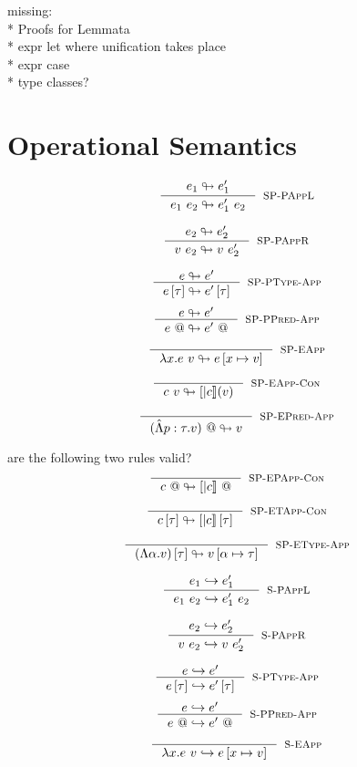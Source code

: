 \documentclass[10pt,a4paper]{article}
\newcommand\highlight[2]{{\setlength\fboxsep{1pt}\colorbox{#1}{#2}}}
\def\NV{\highlight{colorNV}}
\newcommand\rulename[1]{\textsc{#1}}
\newcommand\peval[2]{\ensuremath{#1 \looparrowright #2 }}
\newcommand\eval[2]{\ensuremath{#1 \hookrightarrow #2 }}
\begin{document}
\NV{missing:}\\
\NV{* Proofs for Lemmata}\\
\NV{* expr let where unification takes place}\\
\NV{* expr case}\\
\NV{* type classes?}\\


\section*{Operational Semantics}
\hfill\fbox{\peval{e}{e}}

$$
\inference{
	\peval{e_1}{e_1'}
}{
	\peval{\eapp{e_1}{e_2}}{\eapp{e_1'}{e_2}}
}[\rulename{SP-PAppL}]
$$

$$
\inference{
	\peval{e_2}{e_2'}
}{
	\peval{\eapp{v}{e_2}}{\eapp{v}{e_2'}}
}[\rulename{SP-PAppR}]
$$

$$
\inference{
	\peval{e}{e'}
}{
	\peval{\etapp{e}{\tau}}{\etapp{e'}{\tau}}
}[\rulename{SP-PType-App}]
$$
$$
\inference{
	\peval{e}{e'}
}{
	\peval{\epapp{e}}{\epapp{e'}}
}[\rulename{SP-PPred-App}]
$$

$$
\inference{
}{
	\peval{\eapp{\efun{x}{e}}{v}}{e\sub{x}{v}}
}[\rulename{SP-EApp}]
$$

$$
\inference{
}{
	\peval{\eapp{c}{v}}{[|c|](v)}
}[\rulename{SP-EApp-Con}]
$$

$$
\inference{
}{
	\peval{\epapp{(\epabs{p}{\tau}{v})}}{v}
}[\rulename{SP-EPred-App}]
$$

\NV{are the following two rules valid?}
$$
\inference{
}{
	\peval{\epapp{c}}{\epapp{[|c|]}}
}[\rulename{SP-EPApp-Con}]
$$

$$
\inference{
}{
	\peval{\etapp{c}{\tau}}{\etapp{[|c|]}{\tau}}
}[\rulename{SP-ETApp-Con}]
$$

$$
\inference{
}{
	\peval{\etapp{(\etabs{\alpha}{v})}{\tau}}{v\sub{\alpha}{\tau}}
}[\rulename{SP-EType-App}]
$$


\hfill\fbox{\eval{e}{e}}

$$
\inference{
	\eval{e_1}{e_1'}
}{
	\eval{\eapp{e_1}{e_2}}{\eapp{e_1'}{e_2}}
}[\rulename{S-PAppL}]
$$

$$
\inference{
	\eval{e_2}{e_2'}
}{
	\eval{\eapp{v}{e_2}}{\eapp{v}{e_2'}}
}[\rulename{S-PAppR}]
$$

$$
\inference{
	\eval{e}{e'}
}{
	\eval{\etapp{e}{\tau}}{\etapp{e'}{\tau}}
}[\rulename{S-PType-App}]
$$
$$
\inference{
	\eval{e}{e'}
}{
	\eval{\epapp{e}}{\epapp{e'}}
}[\rulename{S-PPred-App}]
$$

$$
\inference{
}{
	\eval{\eapp{\efun{x}{e}}{v}}{e\sub{x}{v}}
}[\rulename{S-EApp}]
$$
\end{document}
